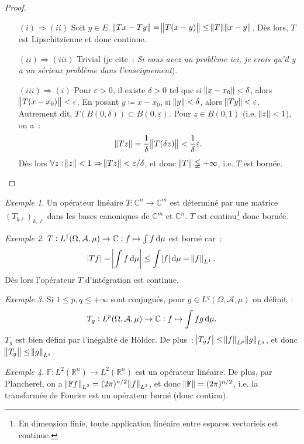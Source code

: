 \documentclass{report}
\newcommand{\C}{{\mathbb C}}
\newcommand{\R}{{\mathbb R}}
\newcommand{\pinfty}{{+\infty}}
\theoremstyle{definition}
\theoremstyle{remark}
\newtheorem{ex}{Exemple}[chapter]
\begin{document}
\begin{proof}~
\begin{itemize}
	\item[$(i) \Rightarrow (ii)$]   Soit $y \in E$. $\norm {Tx - Ty} = \norm {T(x-y)} \leq \norm T\norm {x-y}$. Dès lors, $T$ est Lipschitzienne et donc continue.
	\item[$(ii) \Rightarrow (iii)$] Trivial (je cite~: \textit{Si vous avez un problème ici, je crois qu'il y a un sérieux problème dans l'enseignement}).
	\item[$(iii) \Rightarrow (i)$]  Pour $\varepsilon > 0$, il existe $\delta > 0$ tel que si $\norm {x-x_0} < \delta$, alors $\norm {T(x-x_0)} < \varepsilon$.
		En posant $y \coloneqq x-x_0$, si $\norm y < \delta$, alors $\norm {Ty} < \varepsilon$. Autrement dit, $T(B(0, \delta)) \subset B(0, \varepsilon)$.
		Pour $z \in B(0, 1)$ (i.e. $\norm z < 1$), on a~:
		\[\norm {Tz} = \frac 1\delta\norm {T(\delta z)} < \frac 1\delta \varepsilon.\]
		Dès lors $\forall z : \norm z < 1 \Rightarrow \norm {Tz} < \varepsilon/\delta$, et donc $\norm T \lneqq \pinfty$, i.e. $T$ est bornée.
\end{itemize}
\end{proof}

\begin{ex}
Un opérateur linéaire $T : \C^n \to \C^m$ est déterminé par une matrice $(T_{k\ell})_{k,\ell}$ dans les bases canoniques de $\C^m$ et $\C^n$.
$T$ est continu\footnote{En dimension finie, toute application linéaire entre espaces vectoriels est continue.} donc bornée.
\end{ex}

\begin{ex}
$T : L^1(\Omega, \mathcal A, \mu) \to \C : f \mapsto \int f\dif\mu$ est borné car~:
\[\abs {Tf} = \abs {\int f\dif\mu} \leq \int\abs f\dif\mu = \norm f_{L^1}.\]
Dès lors l'opérateur $T$ d'intégration est continue.
\end{ex}

\begin{ex}
Si $1 \leq p, q \leq \pinfty$ sont conjugués, pour $g \in L^q(\Omega, \mathcal A, \mu)$ on définit~:
\[T_g : L^p(\Omega, \mathcal A, \mu) \to \C : f \mapsto \int fg\dif\mu.\]
$T_g$ est bien défini par l'inégalité de Hölder. De plus~: $\abs {T_gf} \leq \norm f_{L^p}\norm g_{L^q}$, et donc $\norm {T_g} \leq \norm g_{L^q}$.
\end{ex}

\begin{ex}
$\mathbb F : L^2(\R^n) \to L^2(\R^n)$ est un opérateur linéaire. De plus, par Plancherel, on a $\norm {\mathbb Ff}_{L^2} = (2\pi)^{n/2}\norm f_{L^2}$,
et donc $\norm {\mathbb F} = (2\pi)^{n/2}$, i.e. la transformée de Fourier est un opérateur borné (donc continu).
\end{ex}
\end{document}

